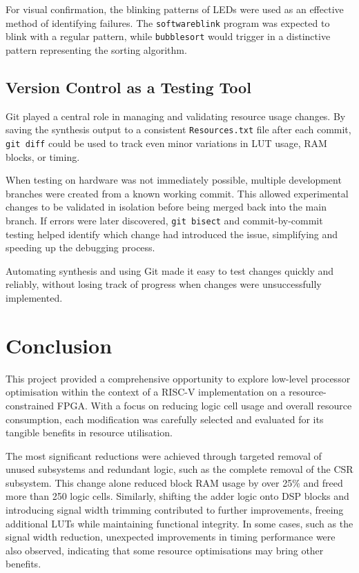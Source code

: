 \documentclass[a4paper,10pt]{article}
\begin{document}
For visual confirmation, the blinking patterns of LEDs were used as an
effective method of identifying failures.
The \texttt{softwareblink} program was expected to blink with a regular pattern, 
while \texttt{bubblesort} would trigger in a distinctive pattern 
representing the sorting algorithm.

\subsection*{Version Control as a Testing Tool}

Git played a central role in managing and validating resource usage changes. 
By saving the synthesis output to a consistent \texttt{Resources.txt} file 
after each commit, \texttt{git diff} could be used to track even minor variations 
in LUT usage, RAM blocks, or timing.

When testing on hardware was not immediately possible, 
multiple development branches were created from a known working commit. 
This allowed experimental changes to be validated in isolation 
before being merged back into the main branch. 
If errors were later discovered, \texttt{git bisect} and 
commit-by-commit testing helped identify which change had introduced the issue,
simplifying and speeding up the debugging process.

Automating synthesis and using Git made it easy to test changes quickly and reliably, 
without losing track of progress when changes were unsuccessfully implemented.

\section{Conclusion}
\label{sec:Conclusion}

This project provided a comprehensive opportunity to explore 
low-level processor optimisation within the context of a 
RISC-V implementation on a resource-constrained FPGA. 
With a focus on reducing logic cell usage and overall resource consumption, 
each modification was carefully selected and evaluated for its tangible benefits 
in resource utilisation.

The most significant reductions were achieved through targeted 
removal of unused subsystems and redundant logic,
such as the complete removal of the CSR subsystem. 
This change alone reduced block RAM usage by over 25\% and 
freed more than 250 logic cells.
Similarly, shifting the adder logic onto DSP blocks and 
introducing signal width trimming contributed to further improvements, 
freeing additional LUTs while maintaining functional integrity. 
In some cases, such as the signal width reduction, 
unexpected improvements in timing performance were also observed, 
indicating that some resource optimisations may bring other benefits.
\end{document}

